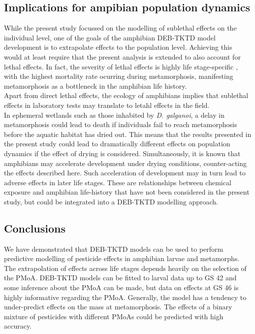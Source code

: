 \documentclass[preprint,12pt]{elsarticle}
\begin{document}
\subsection{Implications for ampibian population dynamics}
\noindent
While the present study focussed on the modelling of sublethal effects on the individual level, 
one of the goals of the amphibian DEB-TKTD model development is to extrapolate effects to the population level.
Achieving this would at least require that the present analysis is extended to also account for lethal effects. 
In fact, the severity of lethal effects is highly life stage-specific \citep{gonzalez-lopezChronicExposurePesticides2026}, 
with the highest mortality rate ocurring during metamorphosis, 
manifesting metamorphosis as a bottleneck in the amphibian life history.\\ 
Apart from direct lethal effects, the ecology of amphibians implies that sublethal effects in laboratory tests 
may translate to letahl effects in the field.\\
In ephemeral wetlands such as those inhabited by \textit{D. galganoi},
a delay in metamorphosis could lead to death if individuals fail to reach metamorphosis 
before the aquatic habitat has dried out. 
This means that the results presented in the present study could lead 
to dramatically different effects on population dynamics if the effect of drying is considered. 
Simultaneously, it is known that amphibians may accelerate development under drying conditions, 
counter-acting the effects described here. 
Such acceleration of development may in turn lead to adverse effects in later life stages. 
These are relationships between chemical exposure and amphibian life-history that have not been considered 
in the present study, but could be integrated into a DEB-TKTD modelling approach.
%
\subsection{Conclusions}
\noindent 
We have demonstrated that DEB-TKTD models can be used to perform predictive modelling 
of pesticide effects in amphibian larvae and metamorphs.
The extrapolation of effects across life stages depends heavily on the selection of the PMoA. 
DEB-TKTD models can be fitted to larval data up to GS 42 and some inference about the PMoA can be made, 
but data on effects at GS 46 is highly informative regarding the PMoA.
Generally, the model has a tendency to under-predict effects on the mass at metamorphosis. 
The effects of a binary mixture of pesticides with different PMoAs could be predicted with high accuracy.
\end{document}
